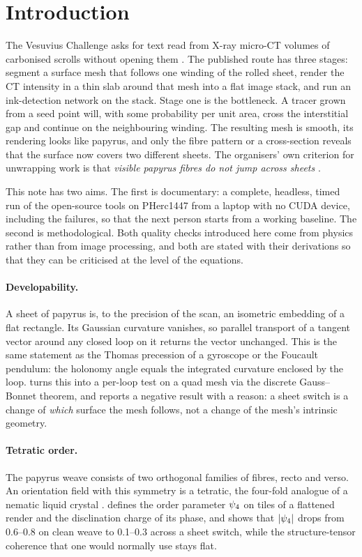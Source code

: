 \section{Introduction}
\label{sec:intro}

The Vesuvius Challenge asks for text read from X-ray micro-CT volumes of carbonised scrolls without opening them \cite{seales2023,scrollprize}. The published route has three stages: segment a surface mesh that follows one winding of the rolled sheet, render the CT intensity in a thin slab around that mesh into a flat image stack, and run an ink-detection network on the stack. Stage one is the bottleneck. A tracer grown from a seed point will, with some probability per unit area, cross the interstitial gap and continue on the neighbouring winding. The resulting mesh is smooth, its rendering looks like papyrus, and only the fibre pattern or a cross-section reveals that the surface now covers two different sheets. The organisers' own criterion for unwrapping work is that \emph{visible papyrus fibres do not jump across sheets} \cite{scrollprize}.

This note has two aims. The first is documentary: a complete, headless, timed run of the open-source tools on PHerc1447 from a laptop with no CUDA device, including the failures, so that the next person starts from a working baseline. The second is methodological. Both quality checks introduced here come from physics rather than from image processing, and both are stated with their derivations so that they can be criticised at the level of the equations.

\paragraph{Developability.} A sheet of papyrus is, to the precision of the scan, an isometric embedding of a flat rectangle. Its Gaussian curvature vanishes, so parallel transport of a tangent vector around any closed loop on it returns the vector unchanged. This is the same statement as the Thomas precession of a gyroscope or the Foucault pendulum: the holonomy angle equals the integrated curvature enclosed by the loop.  turns this into a per-loop test on a quad mesh via the discrete Gauss--Bonnet theorem, and reports a negative result with a reason: a sheet switch is a change of \emph{which} surface the mesh follows, not a change of the mesh's intrinsic geometry.

\paragraph{Tetratic order.} The papyrus weave consists of two orthogonal families of fibres, recto and verso. An orientation field with this symmetry is a tetratic, the four-fold analogue of a nematic liquid crystal \cite{degennes}.  defines the order parameter $\psi_4$ on tiles of a flattened render and the disclination charge of its phase, and shows that $|\psi_4|$ drops from \numrange{0.6}{0.8} on clean weave to \numrange{0.1}{0.3} across a sheet switch, while the structure-tensor coherence that one would normally use stays flat.

